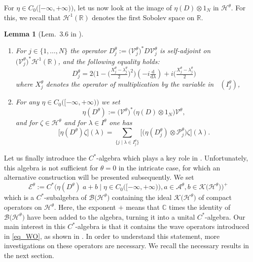 \documentclass[11pt]{article}
\def\AA{\mathcal A}
\def\B{\mathscr B}
\def\C{\mathbb C}
\def\d{\mathrm d}
\def\EE{\mathscr E}
\def\H{\mathcal H}
\def\Hrond{\mathscr H}
\def\K{\mathscr K}
\def\P{\mathcal P}
\def\R{\mathbb R}
\def\V{\mathcal V}
\def\ltwo{\mathop{\mathrm{L}^2}\nolimits}
\newtheorem{Lemma}[Theorem]{Lemma}
\begin{document}
For $\eta\in  C_0\big([-\infty,+\infty)\big)$, let us now look at the image of 
$\eta(D)\otimes 1_N$ in $\Hrond^\theta$. 
For this, we recall that $\H^1(\R)$ denotes the first Sobolev space on $\R$. 

\begin{Lemma}[Lem.~3.6 in \cite{APRR}]
\begin{enumerate}
\item[$(i)$] For $j\in \{1,\dots,N\}$ the operator
$D^\theta_j:=\big(\V_j^\theta\big)^* D\V^\theta_j$ is self-adjoint on $(\V_j^\theta\big)^* \H^1(\R)$, 
and the following equality holds:
$$
D^\theta_j=2\bigg(1-\Big(\tfrac{X^\theta_j-\lambda_j^\theta}{2}\Big)^2\bigg)\left(-i\tfrac{\d}{\d \lambda}\right) 
+i\Big(\tfrac{X^\theta_j-\lambda^\theta_j}{2}\Big)
$$
where $X^\theta_j$ denotes the operator of multiplication by the variable in $\ltwo(I_j^\theta)$,
\item[$(ii)$] For any $\eta\in  C_0\big([-\infty,+\infty)\big)$ we set
\begin{equation*}
\eta(D^\theta):=\big(\V^\theta\big)^* \big(\eta(D)\otimes 1_N \big)\V^\theta, 
\end{equation*}
and for $\zeta \in \Hrond^\theta$ and for $\lambda\in I^\theta$ one has
$$
\big[\eta(D^\theta) \zeta\big](\lambda) 
= \sum_{\{j\mid\lambda\in I^\theta_j\}} \big[\big(\eta(D^\theta_j)\otimes \P_j^\theta\big)\zeta\big](\lambda).
$$
\end{enumerate}
\end{Lemma}

Let us finally introduce the $C^*$-algebra which plays a key role
in \cite{APRR}.
Unfortunately, this algebra is not sufficient for $\theta = 0$ in the intricate case, for which an alternative construction will be presented subsequently. 
We set
\begin{equation}\label{eq_def_EE}
\EE^\theta:=C^*\Big(\eta(D^\theta)\;\!a+b\mid \eta \in   C_0\big([-\infty,+\infty)\big),  a\in \AA^\theta, b\in \K\big(\Hrond^\theta\big)\Big)^+
\end{equation}
which is a $C^*$-subalgebra of $\B\big(\Hrond^\theta\big)$
containing the ideal $\K\big(\Hrond^\theta\big)$ of compact operators on $\Hrond^\theta$.
Here, the exponent $+$ means that $\C$ times the identity of $\B\big(\Hrond^\theta\big)$ have been added to the algebra, turning it into a unital $C^*$-algebra.
Our main interest in this $C^*$-algebra is that it contains the wave operators
introduced in \eqref{eq_WO}, as shown in \cite[Prop.~3.7]{APRR}. 
In order to understand this statement, more investigations on 
these operators are necessary. We recall the necessary results in the next section.
\end{document}
